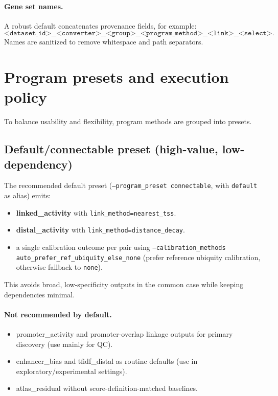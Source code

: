 \documentclass[11pt]{article}
\begin{document}
\paragraph{Gene set names.}
A robust default concatenates provenance fields, for example:
\[
\texttt{<dataset\_id>\_\_<converter>\_\_<group>\_\_<program\_method>\_\_<link>\_\_<select>}.
\]
Names are sanitized to remove whitespace and path separators.

\section{Program presets and execution policy}
\label{sec:presets}
To balance usability and flexibility, program methods are grouped into presets.

\subsection{Default/connectable preset (high-value, low-dependency)}
The recommended default preset (\texttt{--program\_preset connectable}, with \texttt{default} as alias) emits:
\begin{itemize}[leftmargin=2em]
\item \textbf{linked\_activity} with \texttt{link\_method=nearest\_tss}.
\item \textbf{distal\_activity} with \texttt{link\_method=distance\_decay}.
\item a single calibration outcome per pair using \texttt{--calibration\_methods auto\_prefer\_ref\_ubiquity\_else\_none} (prefer reference ubiquity calibration, otherwise fallback to \texttt{none}).
\end{itemize}
This avoids broad, low-specificity outputs in the common case while keeping dependencies minimal.

\paragraph{Not recommended by default.}
\begin{itemize}[leftmargin=2em]
\item promoter\_activity and promoter-overlap linkage outputs for primary discovery (use mainly for QC).
\item enhancer\_bias and tfidf\_distal as routine defaults (use in exploratory/experimental settings).
\item atlas\_residual without score-definition-matched baselines.
\end{itemize}
\end{document}
